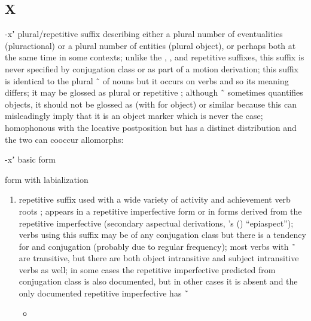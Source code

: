 \subsection{X}\label{sec:alphalist-x}
\begin{morphdesc}[resume*=alphalist]
\item[-xʼ]\label{m:-xʼ}
	plural/repetitive suffix describing either
		a plural number of eventualities (pluractional)
		or a plural number of entities (plural object),
		or perhaps both at the same time in some contexts;
	unlike the , , and  repetitive suffixes,
		this suffix is never specified by conjugation class
		or as part of a motion derivation;
	this suffix is identical to the plural  \~\  of nouns
		but it occurs on verbs and so its meaning differs;
	it may be glossed as plural  or repetitive ;
	although  \~\  sometimes quantifies objects, 
		it should not be glossed as  (with  for object)
		or similar because this can misleadingly imply that it
		is an object marker which is never the case;
	homophonous with the locative postposition 
		but has a distinct distribution and the two can cooccur
	\newline
	allomorphs:
	\begin{allolist}
	\item[-xʼ]	basic form
	\item[\X{-xʼw}]	form with labialization
	\end{allolist}
	\begin{enumerate}
	\item	repetitive suffix used with a wide variety of activity
			and achievement verb roots
			\parencite[534]{crippen:2019};
		appears in a repetitive imperfective form
			or in forms derived from the repetitive imperfective
			(secondary aspectual derivations, 
			\citeauthor{leer:1991}’s (\citeyear{leer:1991}) “epiaspect”);
		verbs using this suffix may be of any conjugation class
			but there is a tendency for 
			and  conjugation (probably due to regular frequency);
		most verbs with  \~\  are transitive,
			but there are both object intransitive
			and subject intransitive verbs as well;
		in some cases the repetitive imperfective predicted from conjugation class
			is also documented, but in other cases it is absent
			and the only documented repetitive imperfective has  \~\ 
		\begin{itemize}
		\item	{}

\end{itemize}
\end{enumerate}
\end{morphdesc}

